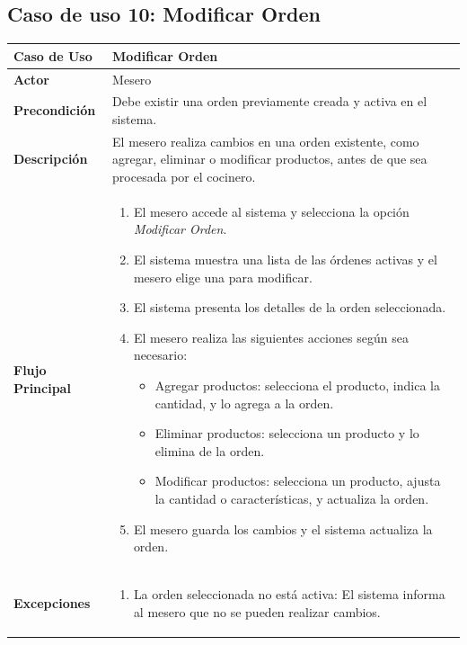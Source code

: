 \documentclass{article}
\begin{document}

\subsection{Caso de uso 10: Modificar Orden}

\begin{table}[H]
    \centering
    \begin{tabular}{|p{4cm}|p{11cm}|}
    \hline
    \textbf{Caso de Uso}        & \textbf{Modificar Orden} \\ \hline
    \textbf{Actor}              & Mesero \\ \hline
    \textbf{Precondición}       & Debe existir una orden previamente creada y activa en el sistema. \\ \hline
    \textbf{Descripción}        & El mesero realiza cambios en una orden existente, como agregar, eliminar o modificar productos, antes de que sea procesada por el cocinero. \\ \hline
    \textbf{Flujo Principal}    & 
    \begin{enumerate}
        \item El mesero accede al sistema y selecciona la opción \textit{Modificar Orden}.
        \item El sistema muestra una lista de las órdenes activas y el mesero elige una para modificar.
        \item El sistema presenta los detalles de la orden seleccionada.
        \item El mesero realiza las siguientes acciones según sea necesario:
        \begin{itemize}
            \item Agregar productos: selecciona el producto, indica la cantidad, y lo agrega a la orden.
            \item Eliminar productos: selecciona un producto y lo elimina de la orden.
            \item Modificar productos: selecciona un producto, ajusta la cantidad o características, y actualiza la orden.
        \end{itemize}
        \item El mesero guarda los cambios y el sistema actualiza la orden.
    \end{enumerate} \\ \hline
    \textbf{Excepciones}        & 
    \begin{enumerate}
        \item La orden seleccionada no está activa: El sistema informa al mesero que no se pueden realizar cambios.

\end{enumerate}
\end{tabular}
\end{table}
\end{document}

